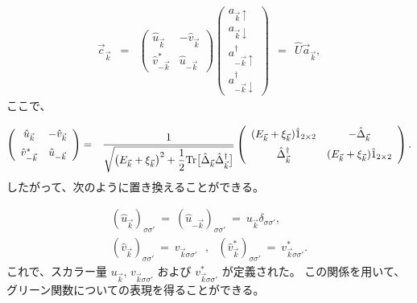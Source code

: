 \documentclass[uplatex,a4j,12pt,dvipdfmx]{jsarticle}
\begin{document}
\begin{eqnarray}
	\vec{c}_{\vec{k}}
	&=&
	\left(
	\begin{array}{cc}
			\hat{u}_{\vec{k}}       & - \hat{v}_{\vec{k}} \\[3mm]
			\hat{v}_{- \vec{k}}^{*} & \hat{u}_{- \vec{k}}
		\end{array}
	\right)
	\!\!\!
	\left(
	\begin{array}{c}
			a_{\vec{k} \uparrow}            \\[2mm]
			a_{\vec{k} \downarrow}          \\[2mm]
			a^{\dagger}_{-\vec{k} \uparrow} \\[2mm]
			a^{\dagger}_{-\vec{k} \downarrow}
		\end{array}
	\right)
	\ \ = \ \
	\hat{U}
	\vec{a}_{\vec{k}}
	,
\end{eqnarray}
%
ここで、

\begin{eqnarray}
	\left(
	\begin{array}{cc}
			\hat{u}_{\vec{k}}       & - \hat{v}_{\vec{k}} \\[2mm]
			\hat{v}_{- \vec{k}}^{*} & \hat{u}_{-\vec{k}}
		\end{array}
	\right)
	&=&
	\dfrac{ 1 }{ \sqrt{ \big( E_{\vec{k}} + \xi_{\vec{k}} \big)^{2} + \dfrac{1}{2} {\rm Tr} \big[ \hat{\Delta}_{\vec{k}} \hat{\Delta}^{\dagger}_{\vec{k}} \big] } }
	\left(
	\begin{array}{cc}
			( E_{\vec{k}} + \xi_{\vec{k}} ) \hat{1}_{2 \times 2} & - \hat{\Delta}_{\vec{k}}                             \\[2mm]
			\hat{\Delta}_{\vec{k}}^{\dagger}                     & ( E_{\vec{k}} + \xi_{\vec{k}} ) \hat{1}_{2 \times 2}
		\end{array}
	\right)
	.
\end{eqnarray}
%
したがって、次のように置き換えることができる。

\begin{eqnarray}
	( \hat{u}_{\vec{k}} )_{\sigma \sigma'}
	\ = \
	( \hat{u}_{- \vec{k}} )_{\sigma \sigma'}
	\ = \
	u_{\vec{k}} \delta_{\sigma \sigma'}
	,
	\\[2mm]
	( \hat{v}_{\vec{k}} )_{\sigma \sigma'}
	\ = \
	v_{\vec{k} \sigma \sigma'}
	\ \ \ , \ \ \
	( \hat{v}_{\vec{k}}^{*} )_{\sigma \sigma'}
	\ = \
	v_{\vec{k} \sigma \sigma'}^{*}
	.
\end{eqnarray}
%
これで、スカラー量 $u_{\vec{k}}$, $v_{\vec{k} \sigma \sigma'}$ および $v_{\vec{k} \sigma \sigma'}^{*}$ が定義された。
この関係を用いて、グリーン関数についての表現を得ることができる。
\end{document}
